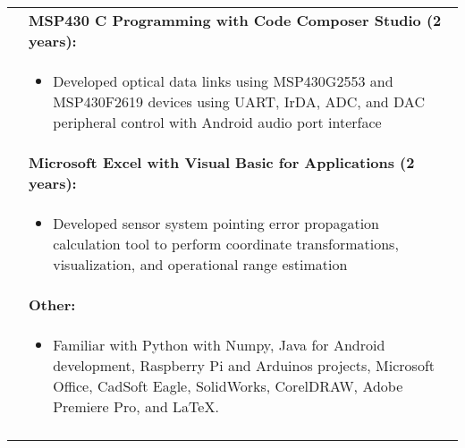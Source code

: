 \begin{tabular}{L{\hlcolw}  L{\rcolw}}
& \textbf{MSP430 C Programming with Code Composer Studio (2 years):} \\
&
\vspace{-0.25in}
\begin{itemize}[leftmargin = \itemmargin]
\item Developed optical data links using MSP430G2553 and MSP430F2619 devices using UART, IrDA, ADC, and DAC peripheral control with Android audio port interface
\end{itemize} \\

& \textbf{Microsoft Excel with Visual Basic for Applications (2 years):}\\
&
\vspace{-0.25in}
\begin{itemize}[leftmargin = \itemmargin]
\item Developed sensor system pointing error propagation calculation tool to perform coordinate transformations, visualization, and operational range estimation
\end{itemize} \\


& \textbf{Other:} \\
&
\vspace{-0.25in}
\begin{itemize}[leftmargin = \itemmargin]
\item Familiar with Python with Numpy, Java for Android development, Raspberry Pi and Arduinos projects, Microsoft Office, CadSoft Eagle, SolidWorks, CorelDRAW, Adobe Premiere Pro, and \LaTeX.
\end{itemize}
\\

\hline \\
\end{tabular}